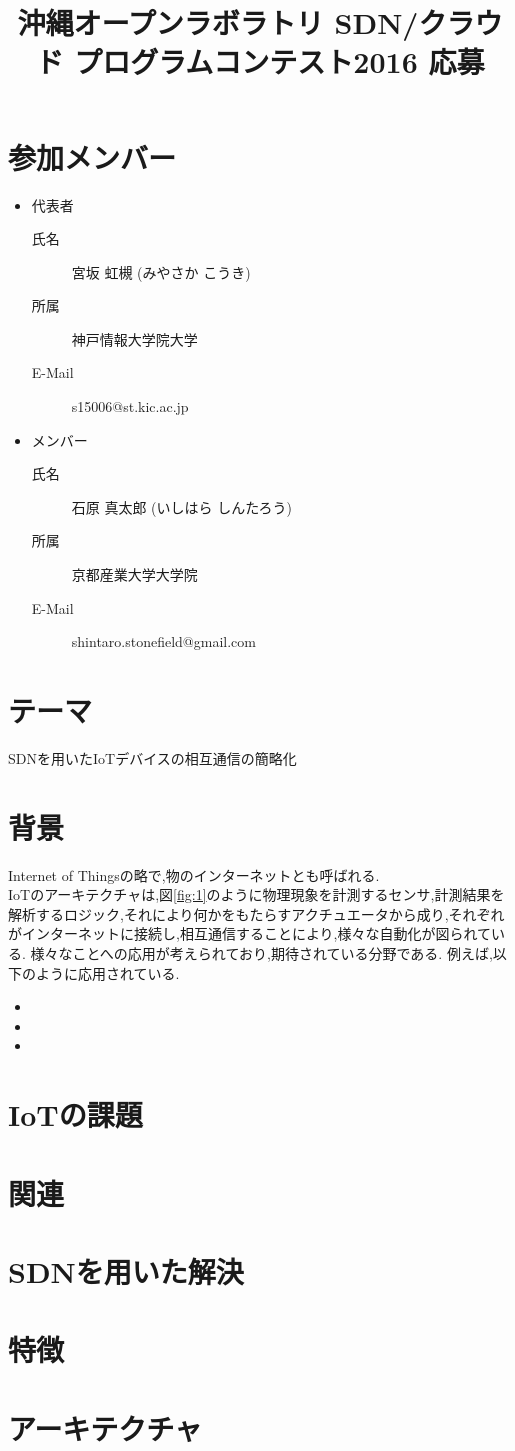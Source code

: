 \documentclass{jsarticle}
\begin{document}
\title{沖縄オープンラボラトリ SDN/クラウド プログラムコンテスト2016 応募}
\maketitle

\section{参加メンバー}
\begin{itemize}
	\item 代表者
		\begin{description}
			\item[氏名] 宮坂 虹槻 (みやさか こうき)
			\item[所属] 神戸情報大学院大学
			\item[E-Mail] s15006@st.kic.ac.jp
		\end{description}
	\item メンバー
		\begin{description}
			\item[氏名] 石原 真太郎 (いしはら しんたろう)
			\item[所属] 京都産業大学大学院
			\item[E-Mail] shintaro.stonefield@gmail.com
		\end{description}
\end{itemize}

\section{テーマ}
	SDNを用いたIoTデバイスの相互通信の簡略化

\section{背景}
	Internet of Thingsの略で,物のインターネットとも呼ばれる.\\
	IoTのアーキテクチャは,図\ref{fig:1}のように物理現象を計測するセンサ,計測結果を解析するロジック,それにより何かをもたらすアクチュエータから成り,それぞれがインターネットに接続し,相互通信することにより,様々な自動化が図られている. 様々なことへの応用が考えられており,期待されている分野である. 例えば,以下のように応用されている.
	\begin{itemize}
		\item 
		\item 
		\item 
	\end{itemize}

\section{IoTの課題}

\section{関連}

\section{SDNを用いた解決}

\section{特徴}

\section{アーキテクチャ}
\end{document}
